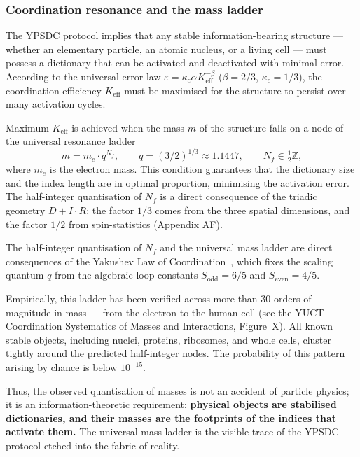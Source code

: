 \documentclass[12pt,a4paper]{article}
\theoremstyle{remark}
\begin{document}
	\subsubsection{Coordination resonance and the mass ladder}
	
	The YPSDC protocol implies that any stable information-bearing structure ---
	whether an elementary particle, an atomic nucleus, or a living cell --- must
	possess a dictionary that can be activated and deactivated with minimal
	error.  According to the universal error law
	\(\varepsilon = \kappa_c\alpha K_{\mathrm{eff}}^{-\beta}\)
	(\(\beta = 2/3\), \(\kappa_c = 1/3\)), the coordination efficiency
	\(K_{\mathrm{eff}}\) must be maximised for the structure to persist over
	many activation cycles.
	
	Maximum \(K_{\mathrm{eff}}\) is achieved when the mass \(m\) of the structure
	falls on a node of the universal resonance ladder
	\begin{equation}
		m = m_e \cdot q^{N_f}, \qquad
		q = (3/2)^{1/3} \approx 1.1447, \qquad N_f \in \tfrac{1}{2}\mathbb{Z},
		\label{eq:mass-ladder}
	\end{equation}
	where \(m_e\) is the electron mass.  This condition guarantees that the
	dictionary size and the index length are in optimal proportion, minimising
	the activation error.  The half-integer quantisation of \(N_f\) is a direct
	consequence of the triadic geometry \(D+I\!\cdot\!R\): the factor \(1/3\)
	comes from the three spatial dimensions, and the factor \(1/2\) from
	spin-statistics (Appendix AF).
	
	The half-integer quantisation of \(N_f\) and the universal mass ladder are
	direct consequences of the Yakushev Law of Coordination~\cite{YakushevLaw2026},
	which fixes the scaling quantum \(q\) from the algebraic loop constants
	\(S_{\mathrm{odd}} = 6/5\) and \(S_{\mathrm{even}} = 4/5\).
	
	Empirically, this ladder has been verified across more than 30 orders of
	magnitude in mass --- from the electron to the human cell (see the YUCT
	Coordination Systematics of Masses and Interactions, Figure~X).  All known
	stable objects, including nuclei, proteins, ribosomes, and whole cells,
	cluster tightly around the predicted half-integer nodes.  The
	probability of this pattern arising by chance is below \(10^{-15}\).
	
	Thus, the observed quantisation of masses is not an accident of particle
	physics; it is an information-theoretic requirement: \textbf{physical
		objects are stabilised dictionaries, and their masses are the footprints
		of the indices that activate them.}  The universal mass ladder is the
	visible trace of the YPSDC protocol etched into the fabric of reality.
	
\end{document}

